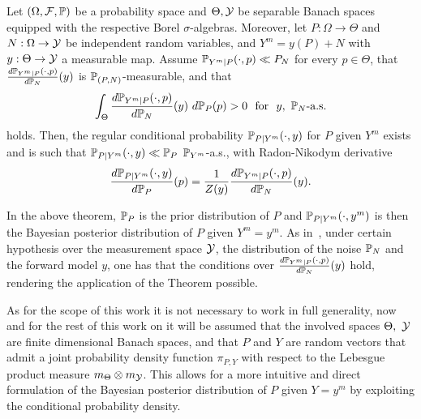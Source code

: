 \begin{thm}
    Let $ (\Omega, \mathcal F , \mathbb P) $ be a probability space and $\Theta, \mathcal Y$ be separable Banach spaces equipped with the respective Borel $\sigma$-algebras. 
    Moreover, let $P : \Omega \rightarrow \Theta$ and $N:\Omega \rightarrow \mathcal Y$ be independent random variables, and $ Y^m = y(P) + N$ with $y: \Theta \rightarrow \mathcal Y$ a measurable map. \newline
    Assume $\mathbb P_{Y^m\mid P}(\cdot, p) \ll P_N$ for every $p \in \Theta$, that $\frac{d \mathbb P_{Y^m\mid P}(\cdot, p)}{d\mathbb P_N}(y) $ is $\mathbb P_{(P,N)}$-measurable, and that 
    \[
        \int_\Theta \frac{d \mathbb P_{Y^m\mid P}(\cdot, p)}{d\mathbb P_N}(y) \ d\mathbb P_P(p) > 0 \ \text{ for }  \ y, \ \mathbb P_N \text{-a.s.}
    \]
    holds.
    Then, the regular conditional probability $\mathbb P_{P\mid Y^m}(\cdot,y)$ for $P$ given $Y^m$ exists and is such that $\mathbb P_{P\mid Y^m}(\cdot, y) \ll \mathbb P _P$ $\mathbb P_{Y^m}$-a.s., with Radon-Nikodym derivative
    \begin{equation}\label{eq:infdimBayes}
        \frac{d\mathbb P_{P\mid Y^m}(\cdot, y)}{d\mathbb P_P}(p) = \frac{1}{Z(y)}\frac{d\mathbb P_{Y^m\mid P}(\cdot, p)}{d\mathbb P_{N}}(y).
    \end{equation}
\end{thm}

In the above theorem, $\mathbb P_P$ is the prior distribution of $P$ and $\mathbb P_{P \mid Y^m}(\cdot, y^m)$ is then the Bayesian posterior distribution of $P$ given $Y^m=y^m$.
As in~\cite[Theorem 6.31]{Stuart2010}, under certain hypothesis over the measurement space $\mathcal Y$, the distribution of the noise $\mathbb P_N$ and the forward model $y$, one has that the conditions over $\frac{d \mathbb P_{Y^m\mid P}(\cdot, p)}{d\mathbb P_N}(y)$ hold, rendering the application of the Theorem possible. \medskip

As for the scope of this work it is not necessary to work in full generality, now and for the rest of this work on it will be assumed that the involved spaces $\Theta, \  \mathcal Y$ are finite dimensional Banach spaces, and that $P$ and $Y$ are random vectors that admit a joint probability density function $\pi_{P,Y}$ with respect to the Lebesgue product measure $m_\Theta \otimes m_\mathcal Y$. 
This allows for a more intuitive and direct formulation of the Bayesian posterior distribution of $P$ given $Y=y^m$ by exploiting the conditional probability density.

